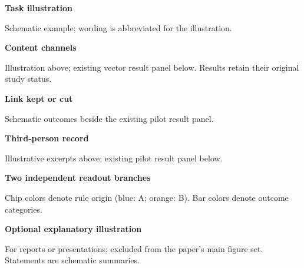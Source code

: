\documentclass[11pt]{article}
\newcommand{\PreviewPage}[3]{%
  {\Large\bfseries #1}\par\smallskip
  {\small #2}\par\vfill
  \begin{center}#3\end{center}
  \vfill\null\newpage
}
\begin{document}
\PreviewPage{Task illustration}{Schematic example; wording is abbreviated for the illustration.}{\MBTaskPanel}
\PreviewPage{Content channels}{Illustration above; existing vector result panel below. Results retain their original study status.}{\begin{minipage}{0.68\linewidth}\centering\MBChannelPanels\end{minipage}}
\PreviewPage{Link kept or cut}{Schematic outcomes beside the existing pilot result panel.}{\MBLinkCutPanels}
\PreviewPage{Third-person record}{Illustrative excerpts above; existing pilot result panel below.}{\begin{minipage}{0.56\linewidth}\centering\MBWordingPanels\end{minipage}}
\PreviewPage{Two independent readout branches}{Chip colors denote rule origin (blue: A; orange: B). Bar colors denote outcome categories.}{\MBPairsPanels}
\PreviewPage{Optional explanatory illustration}{For reports or presentations; excluded from the paper's main figure set. Statements are schematic summaries.}{\begin{minipage}{0.90\linewidth}\centering\MBSummaryPanel\end{minipage}}
\end{document}
